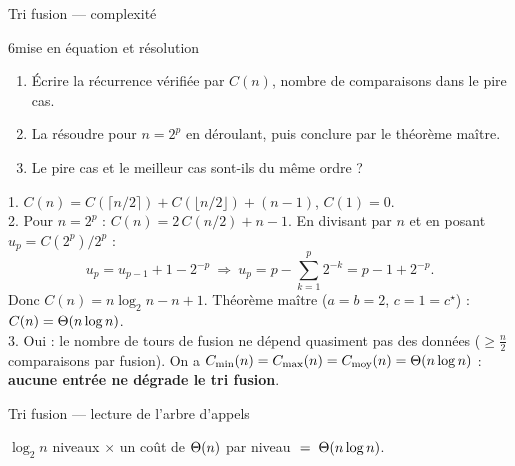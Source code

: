\documentclass[11pt,aspectratio=169]{beamer}
\begin{document}
\begin{frame}[shrink=15]{Tri fusion --- complexité}
\begin{exercice}{6}{mise en équation et résolution}
\begin{enumerate}\setlength\itemsep{1pt}
  \item Écrire la récurrence vérifiée par $C(n)$, nombre de comparaisons dans le pire cas.
  \item La résoudre pour $n=2^p$ en déroulant, puis conclure par le théorème maître.
  \item Le pire cas et le meilleur cas sont-ils du même ordre ?
\end{enumerate}
\end{exercice}
\pause
\begin{soluce}\small
1. $C(n)=C(\lceil n/2\rceil)+C(\lfloor n/2\rfloor)+(n-1)$, \; $C(1)=0$.\\[2pt]
2. Pour $n=2^p$ : $C(n)=2\,C(n/2)+n-1$. En divisant par $n$ et en posant
$u_p=C(2^p)/2^p$ :
\[
u_p=u_{p-1}+1-2^{-p}\ \Longrightarrow\
u_p=p-\sum_{k=1}^{p}2^{-k}=p-1+2^{-p}.
\]
Donc $C(n)=n\log_2 n-n+1$. Théorème maître ($a=b=2$, $c=1=c^\star$) : $C(n)=\Theta(n\log n)$.\\[2pt]
3. Oui : le nombre de tours de fusion ne dépend quasiment pas des données
($\ge \frac n2$ comparaisons par fusion). On a
$C_{\min}(n)=C_{\max}(n)=C_{\text{moy}}(n)=\Theta(n\log n)$ : \textbf{aucune entrée ne dégrade le tri fusion}.
\end{soluce}
\end{frame}

\begin{frame}{Tri fusion --- lecture de l'arbre d'appels}
\begin{center}
\end{center}
\vspace{2pt}
\begin{encadre}
\centering
$\log_2 n$ niveaux $\times$ un coût de $\Theta(n)$ par niveau $\;=\;\Theta(n\log n)$.
\end{encadre}
\end{frame}
\end{document}
